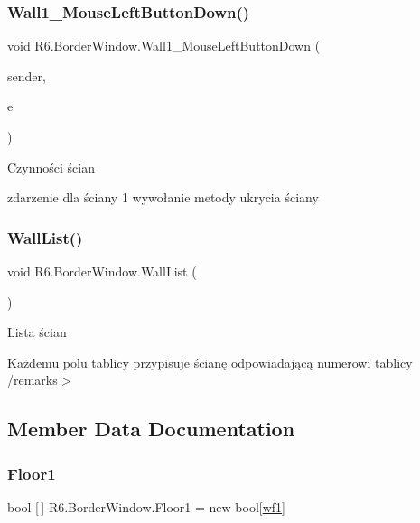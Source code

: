 \subsubsection{\texorpdfstring{Wall1\_MouseLeftButtonDown()}{Wall1\_MouseLeftButtonDown()}}
{\footnotesize\ttfamily void R6.\+Border\+Window.\+Wall1\+\_\+\+Mouse\+Left\+Button\+Down (\begin{DoxyParamCaption}\item[{object}]{sender,  }\item[{Mouse\+Button\+Event\+Args}]{e }\end{DoxyParamCaption})\hspace{0.3cm}{\ttfamily [private]}}



Czynności ścian 

zdarzenie dla ściany 1 wywołanie metody ukrycia ściany \mbox{\label{class_r6_1_1_border_window_a9c3e58b6cbed9a315c21c96b90ba1afc}} 
\subsubsection{\texorpdfstring{WallList()}{WallList()}}
{\footnotesize\ttfamily void R6.\+Border\+Window.\+Wall\+List (\begin{DoxyParamCaption}{ }\end{DoxyParamCaption})\hspace{0.3cm}{\ttfamily [private]}}



Lista ścian 

Każdemu polu tablicy przypisuje ścianę odpowiadającą numerowi tablicy /remarks$>$ 

\subsection{Member Data Documentation}
\mbox{\label{class_r6_1_1_border_window_a3d4d51e8a9d4bba1d66d152127718b55}} 
\subsubsection{\texorpdfstring{Floor1}{Floor1}}
{\footnotesize\ttfamily bool \mbox{[}$\,$\mbox{]} R6.\+Border\+Window.\+Floor1 = new bool\mbox{[}\mbox{\hyperlink{class_r6_1_1_border_window_a516c0f0a2b98623da65e1bb69f4629a9}{wf1}}\mbox{]}\hspace{0.3cm}{\ttfamily [private]}}



